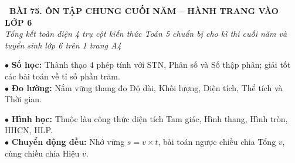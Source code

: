 \documentclass[14pt,a4paper,oneside]{extbook}
\begin{document}
\noindent
\begin{tcolorbox}[
  enhanced,
  colback=teal!8!white,
  colframe=teal!80!black,
  arc=3mm,
  boxrule=1.1pt,
  width=\linewidth,
  halign=center,
  top=2.2mm, bottom=2.2mm,
  left=3mm, right=3mm,
  drop fuzzy shadow
]
  {\large\bfseries\color{teal!95!black}\faBookmark\ BÀI 75. ÔN TẬP CHUNG CUỐI NĂM -- HÀNH TRANG VÀO LỚP 6}\\[2pt]
  {\scriptsize\color{black!75}\itshape Tổng kết toàn diện 4 trụ cột kiến thức Toán 5 chuẩn bị cho kì thi cuối năm và tuyển sinh lớp 6 trên 1 trang A4}
\end{tcolorbox}

\vspace{3.2mm}
\noindent
\begin{minipage}[t]{0.52\textwidth}
  \begin{tcolorbox}[
    enhanced,
    title={\footnotesize\bfseries\color{white}\faBook\ 1. Trọng tâm Số học \& Đo lường},
    colback=blue!2!white,
    colframe=blue!75!black,
    arc=2.5mm, boxrule=0.8pt, top=1.8mm, bottom=1.8mm, left=2.2mm, right=2.2mm
  ]
    \footnotesize
    $\bullet$ \textbf{Số học:} Thành thạo $4$ phép tính với STN, Phân số và Số thập phân; giải tốt các bài toán về tỉ số phần trăm.\\
    $\bullet$ \textbf{Đo lường:} Nắm vững thang đo Độ dài, Khối lượng, Diện tích, Thể tích và Thời gian.
  \end{tcolorbox}
\end{minipage}%
\hfill
\begin{minipage}[t]{0.46\textwidth}
  \begin{tcolorbox}[
    enhanced,
    title={\footnotesize\bfseries\color{white}\faShapes\ 2. Trọng tâm Hình học \& Chuyển động},
    colback=teal!2!white,
    colframe=teal!75!black,
    arc=2.5mm, boxrule=0.8pt, top=1.8mm, bottom=1.8mm, left=2mm, right=2mm
  ]
    \footnotesize
    $\bullet$ \textbf{Hình học:} Thuộc làu công thức diện tích Tam giác, Hình thang, Hình tròn, HHCN, HLP.\\
    $\bullet$ \textbf{Chuyển động đều:} Nhớ vững $s = v \times t$, bài toán ngược chiều chia Tổng $v$, cùng chiều chia Hiệu $v$.
  \end{tcolorbox}
\end{minipage}

\vspace{3mm}
\end{document}
